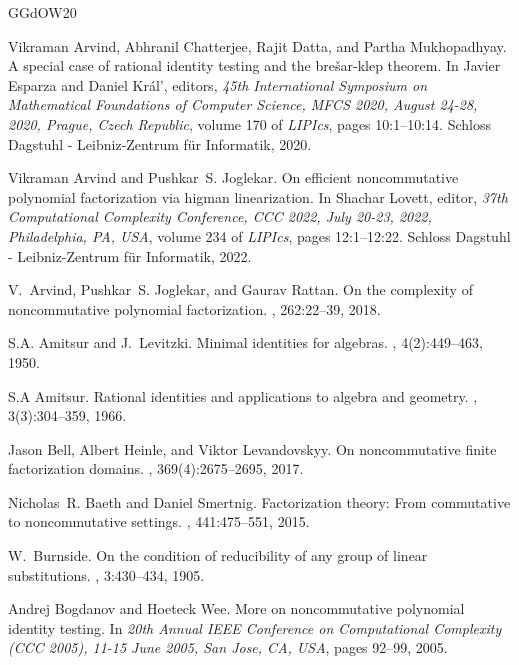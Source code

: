 \documentclass[10pt,a4paper]{article}
\begin{document}
\begin{thebibliography}{GGdOW20}

Vikraman Arvind, Abhranil Chatterjee, Rajit Datta, and Partha Mukhopadhyay.
\newblock A special case of rational identity testing and the bre{\v{s}}ar-klep
  theorem.
\newblock In Javier Esparza and Daniel Kr{\'{a}}l', editors, {\em 45th
  International Symposium on Mathematical Foundations of Computer Science,
  {MFCS} 2020, August 24-28, 2020, Prague, Czech Republic}, volume 170 of {\em
  LIPIcs}, pages 10:1--10:14. Schloss Dagstuhl - Leibniz-Zentrum f{\"{u}}r
  Informatik, 2020.

Vikraman Arvind and Pushkar~S. Joglekar.
\newblock On efficient noncommutative polynomial factorization via higman
  linearization.
\newblock In Shachar Lovett, editor, {\em 37th Computational Complexity
  Conference, {CCC} 2022, July 20-23, 2022, Philadelphia, PA, {USA}}, volume
  234 of {\em LIPIcs}, pages 12:1--12:22. Schloss Dagstuhl - Leibniz-Zentrum
  f{\"{u}}r Informatik, 2022.

V.~Arvind, Pushkar~S. Joglekar, and Gaurav Rattan.
\newblock On the complexity of noncommutative polynomial factorization.
, 262:22--39, 2018.

S.A. Amitsur and J.~Levitzki.
\newblock Minimal identities for algebras.
,
  4(2):449--463, 1950.

S.A Amitsur.
\newblock Rational identities and applications to algebra and geometry.
, 3(3):304--359, 1966.

Jason Bell, Albert Heinle, and Viktor Levandovskyy.
\newblock On noncommutative finite factorization domains.
,
  369(4):2675--2695, 2017.

Nicholas~R. Baeth and Daniel Smertnig.
\newblock Factorization theory: From commutative to noncommutative settings.
, 441:475--551, 2015.

W.~Burnside.
\newblock On the condition of reducibility of any group of linear
  substitutions.
, 3:430--434, 1905.

Andrej Bogdanov and Hoeteck Wee.
\newblock More on noncommutative polynomial identity testing.
\newblock In {\em 20th Annual {IEEE} Conference on Computational Complexity
  {(CCC} 2005), 11-15 June 2005, San Jose, CA, {USA}}, pages 92--99, 2005.


\end{thebibliography}
\end{document}
